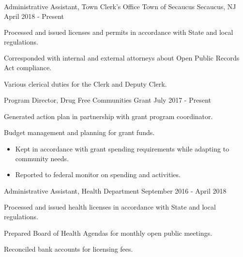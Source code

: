 

\begin{cventries}

  \cventry
    {Administrative Assistant, Town Clerk’s Office} %
    {Town of Secaucus} %
    {Secaucus, NJ} %
    {April 2018 - Present} %
    {
      \begin{cvitems} %
        \item {Processed and issued licenses and permits in accordance with State and local regulations.}
        \item {Corresponded with internal and external attorneys about Open Public Records Act compliance.}
        \item {Various clerical duties for the Clerk and Deputy Clerk.}
      \end{cvitems}
    }

  \cventry
    {Program Director, Drug Free Communities Grant} %
    {} %
    {} %
    {July 2017 - Present} %
    {
      \begin{cvitems} %
        \item {Generated action plan in partnership with grant program coordinator.}
        \item {Budget management and planning for grant funds.}
        \begin{itemize}
          \item {Kept in accordance with grant spending requirements while adapting to community needs.}
          \item {Reported to federal monitor on spending and activities.}
        \end{itemize}
      \end{cvitems}
    }

  \cventry
    {Administrative Assistant, Health Department} %
    {} %
    {} %
    {September 2016 - April 2018} %
    {
      \begin{cvitems} %
        \item {Processed and issued health licenses in accordance with State and local regulations.}
        \item {Prepared Board of Health Agendas for monthly open public meetings.}
        \item {Reconciled bank accounts for licensing fees.}
      \end{cvitems}
    }


\end{cventries}
